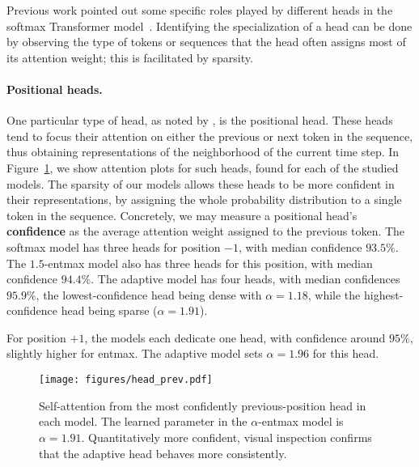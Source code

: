 \documentclass[11pt,a4paper]{article}
\newcommand{\figref}[1]{Figure~\ref{fig:#1}}
\newcommand*\entmaxtext{entmax\xspace}
\begin{document}
Previous work pointed out some specific roles played by
different heads in the softmax Transformer
model~\citep{voita2018context,tang2018why,specialized}. Identifying
the specialization of a head can be done by observing the
type of tokens or sequences that the head often assigns most
of its attention weight; this is facilitated by sparsity.

\paragraph{Positional heads.}
One particular type of head, as noted by \citet{specialized}, is the
positional head. These heads tend to focus their attention on either
the previous or next token in the sequence, thus obtaining
representations of the neighborhood of the current time step. In
\figref{head_prev}, we show attention plots for such heads, found for
each of the studied models. The sparsity of our models allows these
heads to be more confident in their representations, by assigning the
whole probability distribution to a single token in the sequence.
Concretely, we may measure a positional head's \textbf{confidence} as
the average attention weight assigned to the previous token. The
softmax model has three heads for position $-1$, with median
confidence $93.5\%$. The $1.5$-\entmaxtext model also has three heads
for this position, with median confidence $94.4\%$. The adaptive
model has four heads, with median confidences $95.9\%$, the
lowest-confidence head being dense with $\alpha=1.18$, while the
highest-confidence head being sparse ($\alpha=1.91$).

For position $+1$, the models each dedicate one head, with confidence
around $95\%$, slightly higher for \entmaxtext. The adaptive model
sets $\alpha=1.96$ for this head.

\begin{figure}[h]
    \texttt{[image: figures/head\_prev.pdf]}
\caption{Self-attention from the most confidently previous-position head in
each model. The learned parameter in the $\alpha$-\entmaxtext model
is $\alpha=1.91$. Quantitatively more confident, visual inspection
confirms that the adaptive head behaves more consistently.}
\label{fig:head_prev}
\end{figure}
\end{document}
